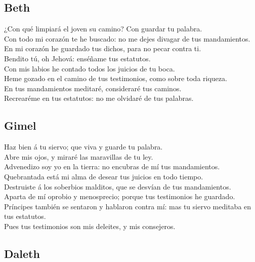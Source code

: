 \hypertarget{beth}{%
\subsection{Beth}\label{beth}}

 ¿Con qué limpiará el joven su camino? Con guardar tu
palabra.\\
 Con todo mi corazón te he buscado: no me dejes divagar de
tus mandamientos.\\
 En mi corazón he guardado tus dichos, para no pecar contra
ti.\\
 Bendito tú, oh Jehová: enséñame tus estatutos.\\
 Con mis labios he contado todos los juicios de tu boca.\\
 Heme gozado en el camino de tus testimonios, como sobre
toda riqueza.\\
 En tus mandamientos meditaré, consideraré tus caminos.\\
 Recrearéme en tus estatutos: no me olvidaré de tus
palabras.

\hypertarget{gimel}{%
\subsection{Gimel}\label{gimel}}

 Haz bien á tu siervo; que viva y guarde tu palabra.\\
 Abre mis ojos, y miraré las maravillas de tu ley.\\
 Advenedizo soy yo en la tierra: no encubras de mí tus
mandamientos.\\
 Quebrantada está mi alma de desear tus juicios en todo
tiempo.\\
 Destruiste á los soberbios malditos, que se desvían de tus
mandamientos.\\
 Aparta de mí oprobio y menosprecio; porque tus testimonios
he guardado.\\
 Príncipes también se sentaron y hablaron contra mí: mas tu
siervo meditaba en tus estatutos.\\
 Pues tus testimonios son mis deleites, y mis consejeros.

\hypertarget{daleth}{%
\subsection{Daleth}\label{daleth}}

